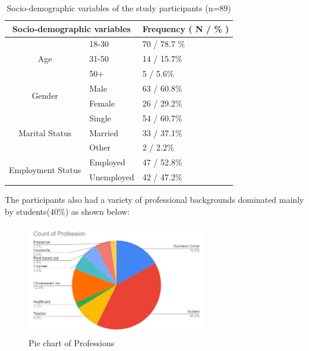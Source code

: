 \documentclass[runningheads]{llncs}
\begin{document}
\begin{center}
\begin{table} [H]
\label{tab:my-table}
\begin{center}
\begin{tabular}{|c|l|l|}
\hline
\multicolumn{2}{|c|}{Socio-demographic variables} & Frequency ( N / \% ) \\ \hline
\multirow{3}{*}{Age}                & 18-30       & 70 / 78.7  \%        \\ \cline{2-3} 
                                    & 31-50       & 14 / 15.7\%          \\ \cline{2-3} 
                                    & 50+         & 5  / 5.6\%           \\ \hline
\multirow{2}{*}{Gender}             & Male        & 63 / 60.8\%          \\ \cline{2-3} 
                                    & Female      & 26 / 29.2\%          \\ \hline
\multirow{3}{*}{Marital Status}     & Single      & 54 / 60.7\%          \\ \cline{2-3} 
                                    & Married     & 33 / 37.1\%          \\ \cline{2-3} 
                                    & Other       & 2 / 2.2\%            \\ \hline
\multirow{2}{*}{Employment Status}  & Employed    & 47 / 52.8\%          \\ \cline{2-3} 
                                    & Unemployed  & 42 / 47.2\%          \\ \hline
\end{tabular}
\end{center}

\caption{Socio-demographic variables of the study participants (n=89)}
\end{table}
\end{center}
The participants also had a variety of professional backgrounds dominated mainly by students(40\%) as shown below: 
\begin{figure}[H]
    \centering
  \includegraphics[width=0.7\textwidth]{graphs/profession2.PNG}
    \caption{Pie chart of Professions}
\end{figure}
\end{document}
